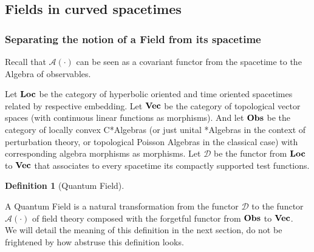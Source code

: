 \documentclass[a4paper,11pt]{article}
\numberwithin{equation}{section}
\theoremstyle{definition}
\newtheorem{definition}{Definition}
\begin{document}
    
\subsection{Fields in curved spacetimes}

\subsubsection{Separating the notion of a Field from its spacetime}
Recall that $\mathcal{A}(\cdot)$ can be seen as a covariant functor from the spacetime to the Algebra of observables.
        
Let $\bold{Loc}$ be the category of hyperbolic oriented and time oriented spacetimes related by respective embedding. Let $\bold{Vec}$ be the category of topological vector spaces (with continuous linear functions as morphisms). And let $\bold{Obs}$ be the category of locally convex C*Algebras (or just unital *Algebras in the context of perturbation theory, or topological Poisson Algebras in the classical case) with corresponding algebra morphisms as morphisms. 
Let $\mathcal{D}$ be the functor from $\bold{Loc}$ to $\bold{Vec}$ that associates to every spacetime its compactly supported test functions.

\begin{definition}[Quantum Field]\label{QField}$\quad$

    A Quantum Field is a natural transformation from the functor $\mathcal{D}$ to the functor $\mathcal{A}(\cdot)$ of field theory composed with the forgetful functor from $\bold{Obs}$ to $\bold{Vec}$.\\
    We will detail the meaning of this definition in the next section, do not be frightened by how abstruse this definition looks.
\end{definition}
\end{document}

